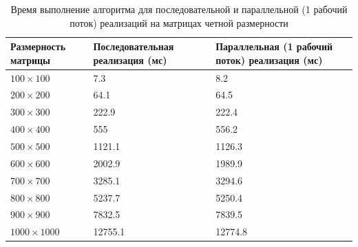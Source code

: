 \documentclass[a4paper,14pt]{article}
\begin{document}
    	\begin{table} [h!]
    	\begin{center}
    	\caption{Время выполнение алгоритма для последовательной и параллельной (1 рабочий поток) реализаций на матрицах четной размерности}
    	\begin{tabular}{|p{5cm}|p{5cm}|p{5cm}|}
    	\hline 
    	Размерность матрицы & Последовательная реализация (мс) & Параллельная (1 рабочий поток) реализация (мс) \\ 
    	\hline 
    	$100 \times 100$ & 7.3 & 8.2 \\ 
    	\hline 
    	$200 \times 200$ & 64.1 & 64.5 \\ 
    	\hline 
    	$300 \times 300$ & 222.9 & 222.4 \\ 
    	\hline 
    	$400 \times 400$ & 555 & 556.2 \\ 
    	\hline 
    	$500 \times 500$ & 1121.1 & 1126.3 \\ 
    	\hline 
    	$600 \times 600$ & 2002.9 & 1989.9  \\ 
    	\hline 
    	$700 \times 700$ & 3285.1 & 3294.6 \\ 
    	\hline 
    	$800 \times 800$ & 5237.7 & 5250.4 \\ 
    	\hline 
    	$900 \times 900$ & 7832.5 & 7839.5 \\ 
    	\hline 
    	$1000 \times 1000$ & 12755.1 & 12774.8 \\ 
    	\hline 
    	\end{tabular} 
    	\label{table:table01}
    	\end{center}
    	\end{table}
    	
\end{document}
